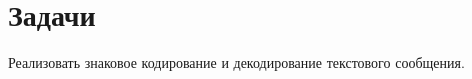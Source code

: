 \chapter*{Задачи}
\label{ch:intro}

Реализовать знаковое кодирование и декодирование текстового сообщения.
\endinput